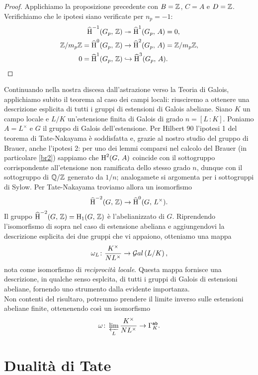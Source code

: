 \begin{proof}
	Applichiamo la proposizione precedente con $ B = \mathbb{Z} $, $ C = A $ e $ D = \mathbb{Z} $. Verifichiamo che le ipotesi siano verificate per $ n_p = -1 $:
	\begin{align*}
		\operatorname{\widehat{H}}^{-1}(G_p,\, \mathbb{Z}) &\twoheadrightarrow \operatorname{\widehat{H}}^{1}(G_p,\, A) = 0, \\
		\mathbb{Z}/m_p\mathbb{Z}=\operatorname{\widehat{H}}^{0}(G_p,\, \mathbb{Z}) &\to \operatorname{\widehat{H}}^{2}(G_p,\, A) = \mathbb{Z}/m_p\mathbb{Z}, \\
		0 = \operatorname{\widehat{H}}^{1}(G_p,\, \mathbb{Z}) &\hookrightarrow \operatorname{\widehat{H}}^{3}(G_p,\, A).
	\end{align*}
\end{proof}

Continuando nella nostra discesa dall'astrazione verso la Teoria di Galois, applichiamo subito il teorema al caso dei campi locali: riusciremo a ottenere una descrizione esplicita di tutti i gruppi di estensioni di Galois abeliane. Siano $ K $ un campo locale e $ L / K  $ un'estensione finita di Galois di grado $ n = [L\,\colon K] $. Poniamo $ A = L^\times $ e $ G $ il gruppo di Galois dell'estensione. Per Hilbert 90 l'ipotesi 1 del teorema di Tate-Nakayama è soddisfatta e, grazie al nostro studio del gruppo di Brauer, anche l'ipotesi 2: per uno dei lemmi comparsi nel calcolo del Brauer (in particolare \ref{br2}) sappiamo che $ \operatorname{H}^2(G, \, A) $ coincide con il sottogruppo corrispondente all'etensione non ramificata dello stesso grado $ n $, dunque con il sottogruppo di $ \mathbb{Q}/\mathbb{Z} $ generato da $ 1/n $; analogamete si argomenta per i sottogruppi di Sylow. Per Tate-Nakayama troviamo allora un isomorfismo
\[ \operatorname{\widehat{H}}^{-2}(G, \, \mathbb{Z}) \to \operatorname{\widehat{H}}^{0}(G, \,  L^\times). \]
Il gruppo $ \operatorname{\widehat{H}}^{-2}(G, \, \mathbb{Z}) = \operatorname{H}_1(G, \, \mathbb{Z}) $ è l'abelianizzato di $ G $.
Riprendendo l'isomorfismo di sopra nel caso di estensione abeliana e aggiungendovi la descrizione esplicita dei due gruppi che vi appaiono, otteniamo una mappa
\[ \omega_L\colon \frac{K^\times}{NL^\times} \to \mathcal{G}al\left( L/K \right), \]
nota come isomorfismo di \emph{reciprocità locale}. Questa mappa fornisce una descrizione, in qualche senso esplcita, di tutti i gruppi di Galois di estensioni abeliane, fornendo uno strumento dalla evidente importanza. \\

Non contenti del risultaro, potremmo prendere il limite inverso sulle estensioni abeliane finite, ottenenendo così un isomorfismo
\[ \omega\colon \varprojlim_L \frac{K^\times}{NL^\times} \to \Gamma_K^{\texttt{ab}} . \]


\section{Dualità di Tate}





